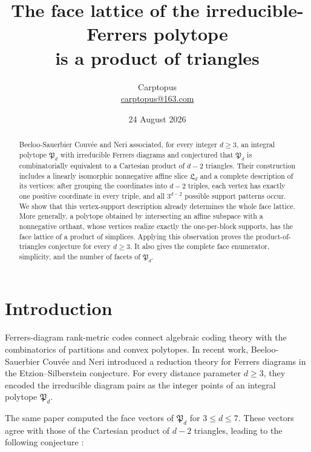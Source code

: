 \documentclass[11pt]{article}
\title{The face lattice of the irreducible-Ferrers polytope\\
is a product of triangles}
\author{Carptopus\\\href{mailto:carptopus@163.com}{carptopus@163.com}}
\date{24 August 2026}
\theoremstyle{remark}
\numberwithin{equation}{section}
\begin{document}
\maketitle

\begin{center}
\end{center}

\begin{abstract}


Beeloo-Sauerbier Couvée and Neri associated, for every integer $d\geq 3$,
an integral polytope $\mathfrak P_d$ with irreducible Ferrers diagrams and
conjectured that $\mathfrak P_d$ is combinatorially equivalent to a Cartesian
product of $d-2$ triangles. Their construction includes a linearly isomorphic
nonnegative affine slice $\mathfrak L_d$ and a complete description of its
vertices: after grouping the coordinates into $d-2$ triples, each vertex has
exactly one positive coordinate in every triple, and all $3^{d-2}$ possible
support patterns occur. We show that this vertex-support description already
determines the whole face lattice. More generally, a polytope obtained by
intersecting an affine subspace with a nonnegative orthant, whose vertices
realize exactly the one-per-block supports, has the face lattice of a product
of simplices. Applying this observation proves the product-of-triangles
conjecture for every $d\geq 3$. It also gives the complete face enumerator,
simplicity, and the number of facets of $\mathfrak P_d$.

\end{abstract}

\section{Introduction}


Ferrers-diagram rank-metric codes connect algebraic coding theory with the
combinatorics of partitions and convex polytopes. In recent work,
Beeloo-Sauerbier Couvée and Neri \cite{couvee2026} introduced a reduction theory for Ferrers
diagrams in the Etzion--Silberstein conjecture. For every distance parameter
$d\geq 3$, they encoded the irreducible diagram pairs as the integer points of
an integral polytope $\mathfrak P_d$.

The same paper computed the face vectors of $\mathfrak P_d$ for
$3\leq d\leq 7$. These vectors agree with those of the Cartesian product of
$d-2$ triangles, leading to the following conjecture \cite[Conjecture 5.28]{couvee2026}:
\end{document}
